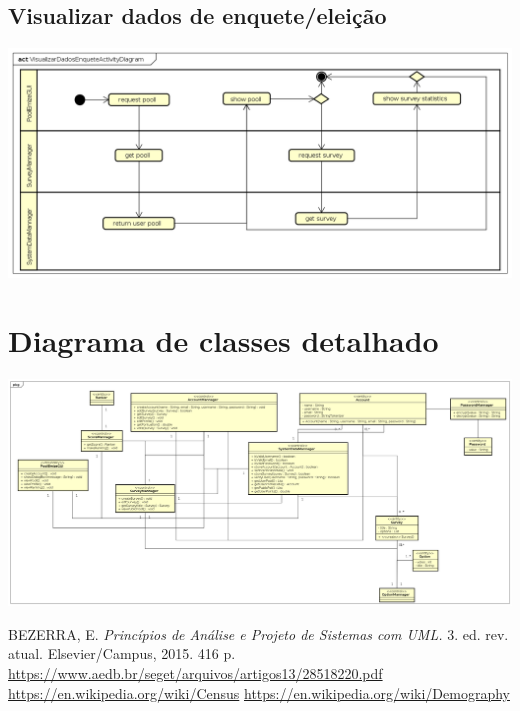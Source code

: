 \documentclass[a4paper,12pt]{report}
\begin{document}
\subsection*{Visualizar dados de enquete/eleição}
\markright{}
\includegraphics[width=14.3cm]{activity_diagrams/VisualizarDadosEnqueteActivityDiagram.png}

\section*{Diagrama de classes detalhado}
\markright{}
\includegraphics[width=14.3cm]{class_diagrams/DetailedClassDiagram.png}

\newpage
\begin{thebibliography}{9}
	BEZERRA, E.
	\textit{Princípios de Análise e Projeto de Sistemas com UML.}
	 3. ed. rev. atual.
	 Elsevier/Campus,
	 2015.
	 416 p.
	\url{https://www.aedb.br/seget/arquivos/artigos13/28518220.pdf}
	\url{https://en.wikipedia.org/wiki/Census}
	\url{https://en.wikipedia.org/wiki/Demography}
\end{thebibliography}
\markright{}
\end{document}
